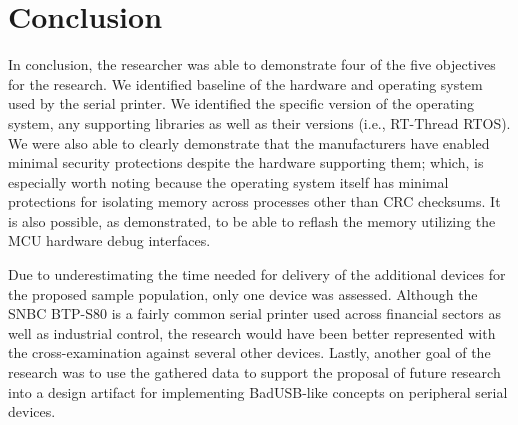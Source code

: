 \section{Conclusion}




In conclusion, the researcher was able to demonstrate four of the five objectives for the research. We identified baseline of the hardware and operating system used by the serial printer. We identified the specific version of the operating system, any supporting libraries as well as their versions (i.e., RT-Thread RTOS). We were also able to clearly demonstrate that the manufacturers have enabled minimal security protections despite the hardware supporting them; which, is especially worth noting because the operating system itself has minimal protections for isolating memory across processes other than CRC checksums. It is also possible, as demonstrated, to be able to reflash the memory utilizing the MCU hardware debug interfaces.

Due to underestimating the time needed for delivery of the additional devices for the proposed sample population, only one device was assessed. Although the SNBC BTP-S80 is a fairly common serial printer used across financial sectors as well as industrial control, the research would have been better represented with the cross-examination against several other devices. Lastly, another goal of the research was to use the gathered data to support the proposal of future research into a design artifact for implementing BadUSB-like concepts on peripheral serial devices. 